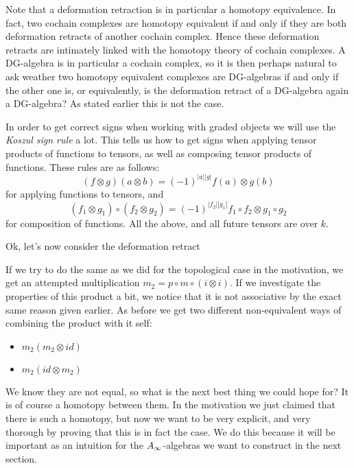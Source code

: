 Note that a deformation retraction is in particular a homotopy equivalence. In fact, two cochain complexes are homotopy equivalent if and only if they are both deformation retracts of another cochain complex. Hence these deformation retracts are intimately linked with the homotopy theory of cochain complexes. A DG-algebra is in particular a cochain complex, so it is then perhaps natural to ask weather two homotopy equivalent complexes are DG-algebras if and only if the other one is, or equivalently, is the deformation retract of a DG-algebra again a DG-algebra? As stated earlier this is not the case. 

In order to get correct signs when working with graded objects we will use the \emph{Koszul sign rule} a lot. This tells us how to get signs when applying tensor products of functions to tensors, as well as composing tensor products of functions. These rules are as follows: 
\begin{equation*}
    (f\otimes g)(a\otimes b) = (-1)^{|a||g|}f(a)\otimes g(b)
\end{equation*} 
for applying functions to tensors, and
\begin{equation*}
    (f_1\otimes g_1)\circ (f_2\otimes g_2) = (-1)^{|f_2||g_1|}f_1\circ f_2 \otimes g_1\circ g_2
\end{equation*}
for composition of functions. All the above, and all future tensors are over $k$. 

Ok, let's now consider the deformation retract
\begin{center}
\end{center}

If we try to do the same as we did for the topological case in the motivation, we get an attempted multiplication $m_2 = p\circ m \circ (i\otimes i)$. If we investigate the properties of this product a bit, we notice that it is not associative by the exact same reason given earlier. As before we get two different non-equivalent ways of combining the product with it self:
\begin{itemize}
    \item $m_2(m_2\otimes id)$
    \item $m_2(id\otimes m_2)$
\end{itemize}
We know they are not equal, so what is the next best thing we could hope for? It is of course a homotopy between them. In the motivation we just claimed that there is such a homotopy, but now we want to be very explicit, and very thorough by proving that this is in fact the case. We do this because it will be important as an intuition for the $A_{\infty}$-algebras we want to construct in the next section. 

